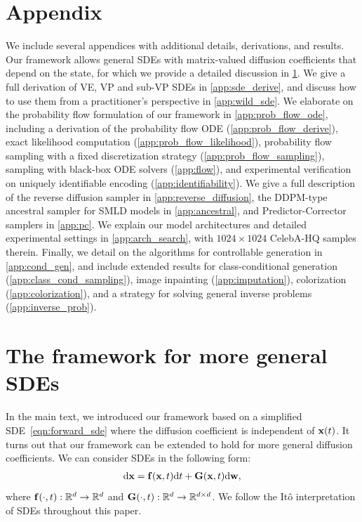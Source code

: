\newpage
\section*{Appendix}
We include several appendices with additional details, derivations, and results.
Our framework allows general SDEs with matrix-valued diffusion coefficients that depend on the state, for which we provide a detailed discussion in \cref{app:general_sde}. We give a full derivation of VE, VP and sub-VP SDEs in \cref{app:sde_derive}, and discuss how to use them from a practitioner's perspective in \cref{app:wild_sde}. We elaborate on the probability flow formulation of our framework in \cref{app:prob_flow_ode}, including a derivation of the probability flow ODE (\cref{app:prob_flow_derive}), exact likelihood computation (\cref{app:prob_flow_likelihood}), probability flow sampling with a fixed discretization strategy (\cref{app:prob_flow_sampling}), sampling with black-box ODE solvers (\cref{app:flow}), and experimental verification on uniquely identifiable encoding (\cref{app:identifiability}). We give a full description of the reverse diffusion sampler in \cref{app:reverse_diffusion}, the DDPM-type ancestral sampler for SMLD models in \cref{app:ancestral}, and Predictor-Corrector samplers in \cref{app:pc}. We explain our model architectures and detailed experimental settings in \cref{app:arch_search}, with $1024\times 1024$ CelebA-HQ samples therein. Finally, we detail on the algorithms for controllable generation in \cref{app:cond_gen}, and include extended results for class-conditional generation (\cref{app:class_cond_sampling}), image inpainting (\cref{app:imputation}), colorization (\cref{app:colorization}), and a strategy for solving general inverse problems (\cref{app:inverse_prob}).

\section{The framework for more general SDEs}\label{app:general_sde}
In the main text, we introduced our framework based on a simplified SDE~\cref{eqn:forward_sde} where the diffusion coefficient is independent of $\mathbf{x}(t)$. It turns out that our framework can be extended to hold for more general diffusion coefficients. We can consider SDEs in the following form:
\begin{align}
    \mathrm{d} \mathbf{x} = \mathbf{f}(\mathbf{x}, t) \mathrm{d} t + \mathbf{G}(\mathbf{x}, t) \mathrm{d} \mathbf{w}, \label{eqn:forward_sde_2}
\end{align}
where $\mathbf{f}(\cdot, t): \mathbb{R}^d \to \mathbb{R}^d$ and $\mathbf{G}(\cdot, t): \mathbb{R}^d \to \mathbb{R}^{d\times d}$. We follow the It\^{o} interpretation of SDEs throughout this paper.

